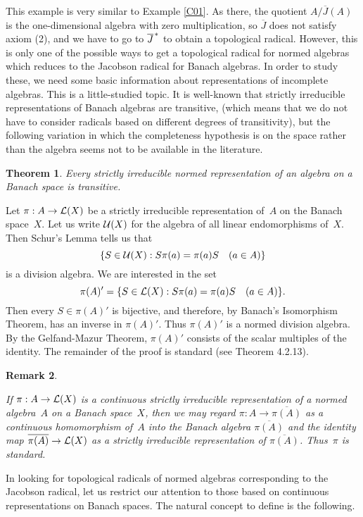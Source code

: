 \documentclass[11pt]{article}
\newcommand{\closure}[1]{\overline{#1}}
\newtheorem{thm}{Theorem}[section]
\newenvironment{Proof}{{\it Proof. }}{}%
\newtheorem{remk}[thm]{Remark}
\newenvironment{Remark}{\begin{remk}\begin{rm}}{\end{rm}\end{remk}}
\newcommand{\barstar}[1]{{\closure{#1}\kern 1pt}^*}
\newcommand{\LX}{{\cal L}(X)}
\newcommand{\UX}{{\cal U}(X)}
\begin{document}
This example is very similar to Example \ref{C01}.  As there, the quotient
$A/\overline{J}(A)$ is the one-dimensional algebra with zero multiplication,
so $\overline{J}$ does not satisfy axiom (2), and we have to go to
$\barstar J$ to obtain a topological radical.   However, this is only one of the possible ways
to get a topological radical for normed algebras which reduces to the Jacobson
radical for Banach algebras.
In order to study these, we need some basic information about representations of
incomplete algebras.   This is a little-studied topic.   It is well-known that
strictly irreducible representations of Banach algebras are transitive, (which
means that we do not have to consider radicals based on different degrees of
transitivity),  but the following variation in which the completeness
hypothesis is on the space rather than the algebra seems not to be available
in the literature.

\begin{thm}\label{T10}
Every strictly irreducible normed representation of an algebra on a Banach
space is transitive.
\end{thm}

\begin{Proof}
Let $\pi:A \to \LX$ be a strictly irreducible representation of~$A$ on the
Banach space~$X$.
Let us write $\UX$ for the algebra of all linear
endomorphisms of~$X$.   Then Schur's Lemma tells us that
$$\{S \in \UX: S\pi(a) = \pi(a)S\quad(a \in A)\}$$
is a division algebra.    We are interested in the set
$$\pi(A)' = \{S \in \LX: S\pi(a) = \pi(a)S\quad(a \in A)\}.$$
Then every $S \in \pi(A)'$ is bijective, and therefore, by
Banach's Isomorphism Theorem, has an inverse in $\pi(A)'$.  Thus
$\pi(A)'$ is a normed division algebra.  By the Gelfand-Mazur Theorem,
$\pi(A)'$ consists of the scalar multiples of the identity.   The remainder
of the proof is standard (see \cite{Palmerbk} Theorem 4.2.13).
\end{Proof}

\begin{Remark}
If $\pi:A \to \LX$ is a continuous strictly irreducible representation
of a normed algebra~$A$ on a Banach space~$X$, then we may regard
$\pi:A \to \closure{\pi(A)}$ as a continuous homomorphism of~$A$ into the
Banach algebra $\closure{\pi(A)}$ and the identity map
$\closure{\pi(A)} \to \LX$ as a strictly irreducible
representation of $\closure{\pi(A)}$.  Thus~$\pi$ is standard.
\end{Remark}

In looking for topological radicals of normed algebras corresponding to the
Jacobson radical, let us restrict our attention to those based on continuous
representations on Banach spaces.  The natural concept to define is the
following.
\end{document}
